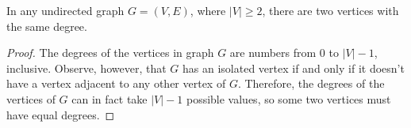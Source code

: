 \begin{theorem}
    In any undirected graph $G=(V,E)$, where $|V|\ge2$, there are two vertices with the same degree.
\end{theorem}

\begin{proof}
    The degrees of the vertices in graph $G$ are numbers from 0 to $|V|-1$, inclusive.
    Observe, however, that $G$ has an isolated vertex if and only if it doesn't have a vertex adjacent to any other vertex of $G$.
    Therefore, the degrees of the vertices of $G$ can in fact take $|V|-1$ possible values, so some two vertices must have equal degrees.
\end{proof}
